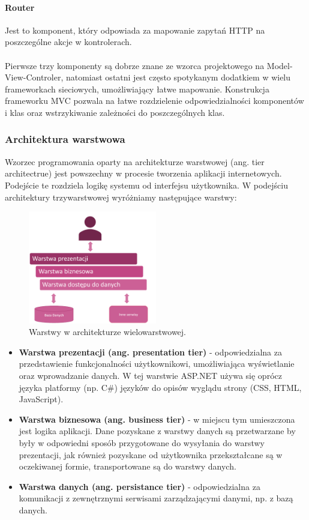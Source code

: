 \documentclass{article}
\begin{document}
\paragraph{Router}
Jest to komponent, który odpowiada za mapowanie zapytań HTTP na poszczególne akcje w kontrolerach.
\\\\
Pierwsze trzy komponenty są dobrze znane ze wzorca projektowego na Model-View-Controler, natomiast ostatni jest często spotykanym dodatkiem w wielu frameworkach sieciowych, umożliwiający łatwe mapowanie. Konstrukcja frameworku MVC pozwala na łatwe rozdzielenie odpowiedzialności komponentów i klas oraz wstrzykiwanie zależności do poszczególnych klas.

\subsubsection{Architektura warstwowa}

Wzorzec programowania oparty na architekturze warstwowej (ang. tier architectrue) jest powszechny w procesie tworzenia aplikacji internetowych. Podejście te rozdziela logikę systemu od interfejsu użytkownika. W podejściu architektury trzywarstwowej wyróżniamy następujące warstwy:

\begin{figure}[h]
\centering
	\includegraphics[width=0.50\textwidth]{ntier.png}
	\caption{Warstwy w architekturze wielowarstwowej.}
	\label{fig:tier}
\end{figure}

\begin{itemize}
\item \textbf{Warstwa prezentacji (ang. presentation tier)} - odpowiedzialna za przedstawienie funkcjonalności użytkownikowi, umożliwiająca wyświetlanie oraz wprowadzanie danych. W tej warstwie ASP.NET używa się oprócz języka platformy (np. C\#) języków do opisów wyglądu strony (CSS, HTML, JavaScript). 
\item \textbf{Warstwa biznesowa (ang. business tier)} - w miejscu tym umieszczona jest logika aplikacji. Dane pozyskane z warstwy danych są przetwarzane by były w odpowiedni sposób przygotowane do wysyłania do warstwy prezentacji, jak również pozyskane od użytkownika przekształcane są w oczekiwanej formie, transportowane są do warstwy danych.

\item \textbf{Warstwa danych (ang. persistance tier)} - odpowiedzialna za komunikacji z zewnętrznymi serwisami zarządzającymi danymi, np. z bazą danych.
\end{itemize}
\end{document}
